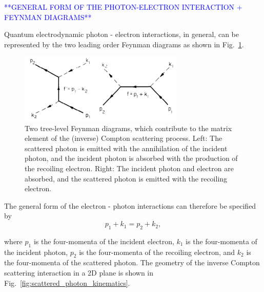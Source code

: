 \documentclass[../main.tex]{subfiles}
\begin{document}
\textcolor{blue}{**GENERAL FORM OF THE PHOTON-ELECTRON INTERACTION + FEYNMAN DIAGRAMS**}

Quantum electrodynamic photon - electron interactions, in general, can be represented by the two leading order Feynman diagrams as shown in Fig.~\ref{fig:ICS_Feynman_diagrams}. 

\begin{figure}[!h]
    \centering\includegraphics[width=0.7\textwidth]{Figures/Theory_of_Photon_Production_by_Inverse_Compton_Scattering/Berestetskii_ICS_Feynman.pdf}
    \caption{Two tree-level Feynman diagrams, which contribute to the matrix element of the (inverse) Compton scattering process. Left: The scattered photon is emitted with the annihilation of the incident photon, and the incident photon is absorbed with the production of the recoiling electron. Right: The incident photon and electron are absorbed, and the scattered photon is emitted with the recoiling electron. \cite{berestetskii1982quantum}}
    \label{fig:ICS_Feynman_diagrams}
\end{figure}

The general form of the electron - photon interactions can therefore be specified by
\begin{equation}
p_{1} + k_{1} = p_{2} + k_{2},
\label{eq:ICS_process}
\end{equation}

where $p_{1}$ is the four-momenta of the incident electron, $k_{1}$ is the four-momenta of the incident photon, $p_{2}$ is the four-momenta of the recoiling electron, and $k_{2}$ is the four-momenta of the scattered photon. The geometry of the inverse Compton scattering interaction in a 2D plane is shown in Fig.~\ref{fig:scattered_photon_kinematics}.
\end{document}
